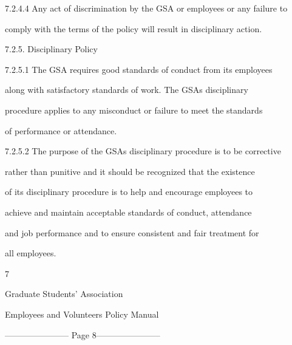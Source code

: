 7.2.4.4 Any act of discrimination by the GSA or employees or any failure to  

          comply with the terms of the policy will result in disciplinary action.  



                                                     



          7.2.5. Disciplinary Policy  



7.2.5.1 The  GSA  requires  good  standards  of  conduct  from  its  employees  

          along   with  satisfactory  standards  of  work.  The  GSAs  disciplinary  

         procedure  applies  to  any misconduct or  failure  to  meet  the  standards  

          of performance or attendance.  



  



7.2.5.2 The  purpose  of  the  GSAs  disciplinary  procedure  is  to  be  corrective  

         rather  than punitive  and  it  should  be  recognized  that  the  existence   

          of   its   disciplinary procedure  is  to  help  and  encourage  employees  to  

          achieve  and  maintain  acceptable  standards   of   conduct,   attendance  

          and  job  performance  and  to  ensure  consistent  and fair treatment for  

          all employees.  



                                                     



                                                     

                                                         7  

  

  

                                  Graduate  Students’ Association  



                         Employees and Volunteers Policy Manual  


----------------------- Page 8-----------------------

